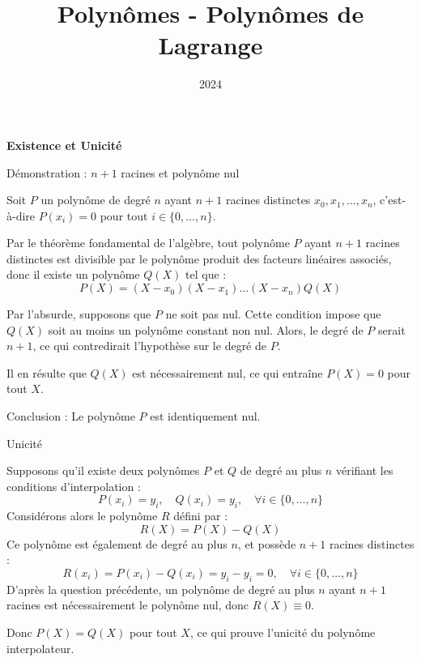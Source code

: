 \documentclass[10pt,a4paper]{article}
\title{Polynômes - Polynômes de Lagrange}
\author{}
\date{2024}
\begin{document}
\bigskip
\textbf{Existence et Unicité}


\q Démonstration : \( n+1 \) racines et polynôme nul

Soit \( P \) un polynôme de degré \( n \) ayant \( n+1 \) racines distinctes \( x_0, x_1, \dots, x_n
\), c'est-à-dire $ P(x_i) = 0 $ pour tout \( i \in \{0, \dots, n\} \).

Par le théorème fondamental de l'algèbre, tout polynôme \( P \) ayant \( n+1 \) racines distinctes
est divisible par le polynôme produit des facteurs linéaires associés, donc il existe un polynôme \(
Q(X) \) tel que :
\[
P(X) = (X - x_0)(X - x_1) \dots (X - x_n) Q(X)
\]

Par l'absurde, supposons que $P$ ne soit pas nul. Cette condition impose que \( Q(X) \) soit au
moins un polynôme constant non nul. Alors, le degré de \( P \) serait \( n+1 \), ce qui contredirait
l'hypothèse sur le degré de \( P \).

Il en résulte que \( Q(X) \) est nécessairement nul, ce qui entraîne $ P(X) = 0 $ pour tout \( X \).

Conclusion : Le polynôme \( P \) est identiquement nul.

\q Unicité

Supposons qu'il existe deux polynômes \( P \) et \( Q \) de degré au plus \( n \) vérifiant les
conditions d'interpolation :
\[
P(x_i) = y_i, \quad Q(x_i) = y_i, \quad \forall i \in \{0, \dots, n\}
\]
Considérons alors le polynôme \( R \) défini par :
\[
R(X) = P(X) - Q(X)
\]
Ce polynôme est également de degré au plus \( n \), et possède \( n+1 \) racines distinctes :
\[
R(x_i) = P(x_i) - Q(x_i) = y_i - y_i = 0, \quad \forall i \in \{0, \dots, n\}
\]
D'après la question précédente, un polynôme de degré au plus \( n \) ayant \( n+1 \) racines est
nécessairement le polynôme nul, donc $ R(X) \equiv 0 $.

Donc \( P(X) = Q(X) \) pour tout \( X \), ce qui prouve l'unicité du polynôme interpolateur.
\end{document}
